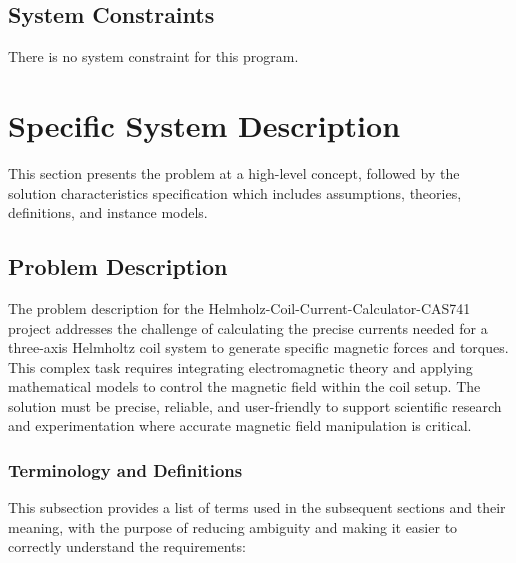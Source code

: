 \documentclass[12pt]{article}
\begin{document}
\subsection{System Constraints}

There is no system constraint for this program.

\section{Specific System Description}

This section presents the problem at a high-level concept, followed by the solution characteristics specification which includes assumptions, theories, definitions, and instance models.

\subsection{Problem Description} \label{Sec_pd}

The problem description for the Helmholz-Coil-Current-Calculator-CAS741 project addresses the challenge of calculating the precise currents needed for a three-axis Helmholtz coil system to generate specific magnetic forces and torques. This complex task requires integrating electromagnetic theory and applying mathematical models to control the magnetic field within the coil setup. The solution must be precise, reliable, and user-friendly to support scientific research and experimentation where accurate magnetic field manipulation is critical.
\subsubsection{Terminology and  Definitions}
This subsection provides a list of terms used in the subsequent
sections and their meaning, with the purpose of reducing ambiguity and making it easier to correctly understand the requirements:
\end{document}
